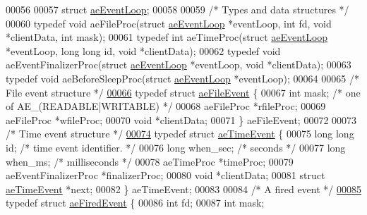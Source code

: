 \begin{DoxyCode}
00056 
00057 \textcolor{keyword}{struct} \hyperlink{structaeEventLoop}{aeEventLoop};
00058 
00059 \textcolor{comment}{/* Types and data structures */}
00060 \textcolor{keyword}{typedef} \textcolor{keywordtype}{void} aeFileProc(\textcolor{keyword}{struct} \hyperlink{structaeEventLoop}{aeEventLoop} *eventLoop, \textcolor{keywordtype}{int} fd, \textcolor{keywordtype}{void} *clientData, \textcolor{keywordtype}{int} mask);
00061 \textcolor{keyword}{typedef} \textcolor{keywordtype}{int} aeTimeProc(\textcolor{keyword}{struct} \hyperlink{structaeEventLoop}{aeEventLoop} *eventLoop, \textcolor{keywordtype}{long} \textcolor{keywordtype}{long} id, \textcolor{keywordtype}{void} *clientData);
00062 \textcolor{keyword}{typedef} \textcolor{keywordtype}{void} aeEventFinalizerProc(\textcolor{keyword}{struct} \hyperlink{structaeEventLoop}{aeEventLoop} *eventLoop, \textcolor{keywordtype}{void} *clientData);
00063 \textcolor{keyword}{typedef} \textcolor{keywordtype}{void} aeBeforeSleepProc(\textcolor{keyword}{struct} \hyperlink{structaeEventLoop}{aeEventLoop} *eventLoop);
00064 
00065 \textcolor{comment}{/* File event structure */}
\hyperlink{structaeFileEvent}{00066} \textcolor{keyword}{typedef} \textcolor{keyword}{struct} \hyperlink{structaeFileEvent}{aeFileEvent} \{
00067     \textcolor{keywordtype}{int} mask; \textcolor{comment}{/* one of AE\_(READABLE|WRITABLE) */}
00068     aeFileProc *rfileProc;
00069     aeFileProc *wfileProc;
00070     \textcolor{keywordtype}{void} *clientData;
00071 \} aeFileEvent;
00072 
00073 \textcolor{comment}{/* Time event structure */}
\hyperlink{structaeTimeEvent}{00074} \textcolor{keyword}{typedef} \textcolor{keyword}{struct} \hyperlink{structaeTimeEvent}{aeTimeEvent} \{
00075     \textcolor{keywordtype}{long} \textcolor{keywordtype}{long} id; \textcolor{comment}{/* time event identifier. */}
00076     \textcolor{keywordtype}{long} when\_sec; \textcolor{comment}{/* seconds */}
00077     \textcolor{keywordtype}{long} when\_ms; \textcolor{comment}{/* milliseconds */}
00078     aeTimeProc *timeProc;
00079     aeEventFinalizerProc *finalizerProc;
00080     \textcolor{keywordtype}{void} *clientData;
00081     \textcolor{keyword}{struct} \hyperlink{structaeTimeEvent}{aeTimeEvent} *next;
00082 \} aeTimeEvent;
00083 
00084 \textcolor{comment}{/* A fired event */}
\hyperlink{structaeFiredEvent}{00085} \textcolor{keyword}{typedef} \textcolor{keyword}{struct} \hyperlink{structaeFiredEvent}{aeFiredEvent} \{
00086     \textcolor{keywordtype}{int} fd;
00087     \textcolor{keywordtype}{int} mask;

\end{DoxyCode}
